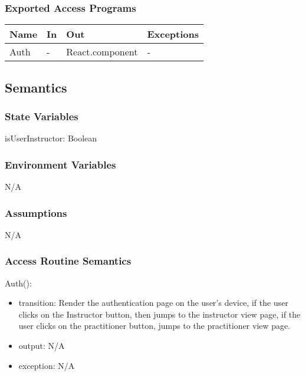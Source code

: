 \documentclass[12pt, titlepage]{article}
\begin{document}
\subsubsection{Exported Access Programs}
\begin{table}[h!]
  \centering
  \begin{tabular}{llll}
    \hline
    \textbf{Name} & \textbf{In} & \textbf{Out}          & \textbf{Exceptions} \\
    \hline
    Auth    & -     & React.component & -             \\
    \hline
  \end{tabular}
\end{table}

\subsection{Semantics}

\subsubsection{State Variables}

isUserInstructor: Boolean

\subsubsection{Environment Variables}

N/A

\subsubsection{Assumptions}

N/A

\subsubsection{Access Routine Semantics}

\noindent Auth():
\begin{itemize}
\item transition: Render the authentication page on the user's device, if the user
  clicks on the Instructor button, then jumps to the instructor view page, if
  the user clicks on the practitioner button, jumps to the practitioner view
  page.
\item output: N/A
\item exception: N/A
\end{itemize}
\end{document}
